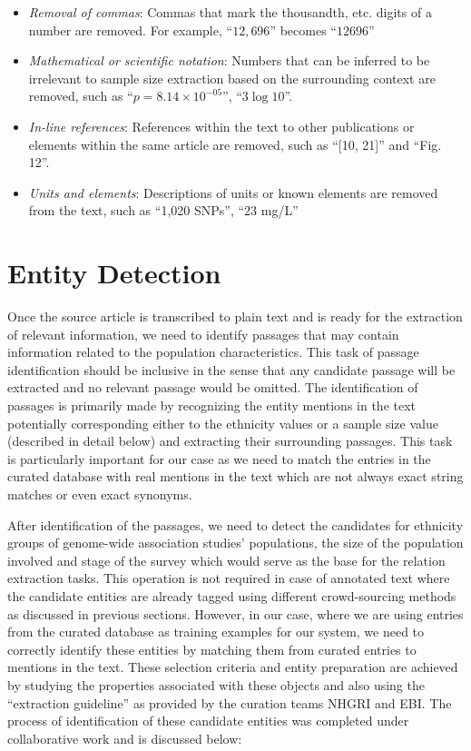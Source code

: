 \begin{itemize}
    \item \emph{Removal of commas}: 
    Commas that mark the thousandth, etc. digits of a number are removed. For example, ``$12,696$'' becomes ``$12696$''
    
    \item \emph{Mathematical or scientific notation}:
    Numbers that can be inferred to be irrelevant to sample size extraction based on the surrounding context are removed, such as ``$p=8.14 \times 10^{-05}$'', ``$3 \log 10$''.

    \item \emph{In-line references}:
    References within the text to other publications or elements within the same article are removed, such as ``[10, 21]'' and ``Fig. 12''.

    \item \emph{Units and elements}:
    Descriptions of units or known elements are removed from the text, such as ``1,020 SNPs'', ``23 mg/L''
\end{itemize}

\section{Entity Detection}
\label{section:entity-detection}
Once the source article is transcribed to plain text and is ready for the extraction of relevant information, we need to identify passages that may contain information related to the population characteristics. This task of passage identification should be inclusive in the sense that any candidate passage will be extracted and no relevant passage would be omitted. The identification of passages is primarily made by recognizing the entity mentions in the text potentially corresponding either to the ethnicity values or a sample size value (described in detail below) and extracting their surrounding passages. This task is particularly important for our case as we need to match the entries in the curated database with real mentions in the text which are not always exact string matches or even exact synonyms.

After identification of the passages, we need to detect the candidates for ethnicity groups of genome-wide association studies' populations, the size of the population involved and stage of the survey which would serve as the base for the relation extraction tasks. This operation is not required in case of annotated text where the candidate entities are already tagged using different crowd-sourcing methods as discussed in previous sections. However, in our case, where we are using entries from the curated database as training examples for our system, we need to correctly identify these entities by matching them from curated entries to mentions in the text. These selection criteria and entity preparation are achieved by studying the properties associated with these objects and also using the ``extraction guideline'' \cite{hindorff2014catalog} as provided by the curation teams NHGRI and EBI.  The process of identification of these candidate entities was completed under collaborative work \cite{kashyapthesis} and is discussed below:

